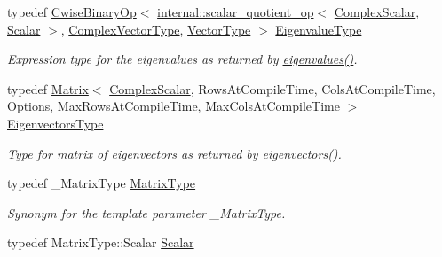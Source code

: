 \begin{DoxyCompactItemize}
\mbox{\label{group___eigenvalues___module_ad59af178acc401f1bc4e330ef80f286d}} 
typedef \hyperlink{group___core___module_class_eigen_1_1_cwise_binary_op}{Cwise\+Binary\+Op}$<$ \hyperlink{struct_eigen_1_1internal_1_1scalar__quotient__op}{internal\+::scalar\+\_\+quotient\+\_\+op}$<$ \hyperlink{group___eigenvalues___module_abdec07af91db1345bb4c74066e3d0ea7}{Complex\+Scalar}, \hyperlink{group___eigenvalues___module_afb318d0b097ff8dd5a7410d31317ca47}{Scalar} $>$, \hyperlink{group___eigenvalues___module_acfd144329aca76882069da2fc5d53ef5}{Complex\+Vector\+Type}, \hyperlink{group___eigenvalues___module_a5aa3d1390c2b0d455c1c9b8b3101b119}{Vector\+Type} $>$ \hyperlink{group___eigenvalues___module_ad59af178acc401f1bc4e330ef80f286d}{Eigenvalue\+Type}
\begin{DoxyCompactList}\small\item\em Expression type for the eigenvalues as returned by \hyperlink{group___eigenvalues___module_a62f01cd78271efd5e39bcb24e0fe1a58}{eigenvalues()}. \end{DoxyCompactList}\item 
typedef \hyperlink{group___core___module_class_eigen_1_1_matrix}{Matrix}$<$ \hyperlink{group___eigenvalues___module_abdec07af91db1345bb4c74066e3d0ea7}{Complex\+Scalar}, Rows\+At\+Compile\+Time, Cols\+At\+Compile\+Time, Options, Max\+Rows\+At\+Compile\+Time, Max\+Cols\+At\+Compile\+Time $>$ \hyperlink{group___eigenvalues___module_afffec018dbb2d87b4c09b6acecbb79cd}{Eigenvectors\+Type}
\begin{DoxyCompactList}\small\item\em Type for matrix of eigenvectors as returned by eigenvectors(). \end{DoxyCompactList}\item 
\mbox{\label{group___eigenvalues___module_a56f4b9823bb9a267de3aaf48428cd247}} 
typedef \+\_\+\+Matrix\+Type \hyperlink{group___eigenvalues___module_a56f4b9823bb9a267de3aaf48428cd247}{Matrix\+Type}
\begin{DoxyCompactList}\small\item\em Synonym for the template parameter {\ttfamily \+\_\+\+Matrix\+Type}. \end{DoxyCompactList}\item 
\mbox{\label{group___eigenvalues___module_afb318d0b097ff8dd5a7410d31317ca47}} 
typedef Matrix\+Type\+::\+Scalar \hyperlink{group___eigenvalues___module_afb318d0b097ff8dd5a7410d31317ca47}{Scalar}

\end{DoxyCompactItemize}
